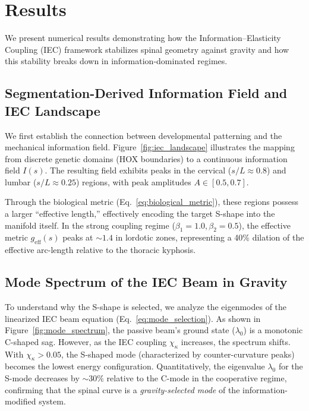 \documentclass[11pt,a4paper]{article}
\begin{document}

\section{Results}

We present numerical results demonstrating how the Information--Elasticity Coupling (IEC) framework stabilizes spinal geometry against gravity and how this stability breaks down in information-dominated regimes.

\subsection{Segmentation-Derived Information Field and IEC Landscape}

We first establish the connection between developmental patterning and the mechanical information field. Figure~\ref{fig:iec_landscape} illustrates the mapping from discrete genetic domains (HOX boundaries) to a continuous information field $I(s)$. The resulting field exhibits peaks in the cervical ($s/L \approx 0.8$) and lumbar ($s/L \approx 0.25$) regions, with peak amplitudes $A \in [0.5, 0.7]$.

Through the biological metric (Eq.~\ref{eq:biological_metric}), these regions possess a larger ``effective length,'' effectively encoding the target S-shape into the manifold itself. In the strong coupling regime ($\beta_1=1.0, \beta_2=0.5$), the effective metric $g_{\mathrm{eff}}(s)$ peaks at $\sim 1.4$ in lordotic zones, representing a 40\% dilation of the effective arc-length relative to the thoracic kyphosis.

\subsection{Mode Spectrum of the IEC Beam in Gravity}

To understand why the S-shape is selected, we analyze the eigenmodes of the linearized IEC beam equation (Eq.~\ref{eq:mode_selection}). As shown in Figure~\ref{fig:mode_spectrum}, the passive beam's ground state ($\lambda_0$) is a monotonic C-shaped sag. However, as the IEC coupling $\chi_\kappa$ increases, the spectrum shifts. With $\chi_\kappa > 0.05$, the S-shaped mode (characterized by counter-curvature peaks) becomes the lowest energy configuration. Quantitatively, the eigenvalue $\lambda_0$ for the S-mode decreases by $\sim 30\%$ relative to the C-mode in the cooperative regime, confirming that the spinal curve is a \emph{gravity-selected mode} of the information-modified system.
\end{document}
